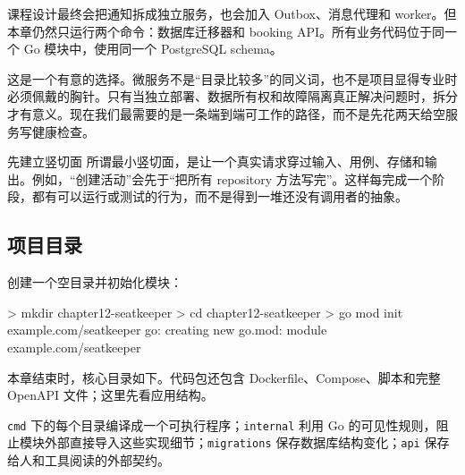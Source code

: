 课程设计最终会把通知拆成独立服务，也会加入 Outbox、消息代理和 worker。但本章仍然只运行两个命令：数据库迁移器和 booking API。所有业务代码位于同一个 Go 模块中，使用同一个 PostgreSQL schema。

这是一个有意的选择。微服务不是“目录比较多”的同义词，也不是项目显得专业时必须佩戴的胸针。只有当独立部署、数据所有权和故障隔离真正解决问题时，拆分才有意义。现在我们最需要的是一条端到端可工作的路径，而不是先花两天给空服务写健康检查。

\begin{tipbox}{先建立竖切面}
所谓最小竖切面，是让一个真实请求穿过输入、用例、存储和输出。例如，“创建活动”会先于“把所有 repository 方法写完”。这样每完成一个阶段，都有可以运行或测试的行为，而不是得到一堆还没有调用者的抽象。
\end{tipbox}

\subsection{项目目录}

创建一个空目录并初始化模块：

\begin{shellcode}[title={初始化 SeatKeeper 模块}]
> mkdir chapter12-seatkeeper
> cd chapter12-seatkeeper
> go mod init example.com/seatkeeper
go: creating new go.mod: module example.com/seatkeeper
\end{shellcode}
\color{PocketInk}

本章结束时，核心目录如下。代码包还包含 Dockerfile、Compose、脚本和完整 OpenAPI 文件；这里先看应用结构。

\begin{treebox}
\end{treebox}

\texttt{cmd} 下的每个目录编译成一个可执行程序；\texttt{internal} 利用 Go 的可见性规则，阻止模块外部直接导入这些实现细节；\texttt{migrations} 保存数据库结构变化；\texttt{api} 保存给人和工具阅读的外部契约。

